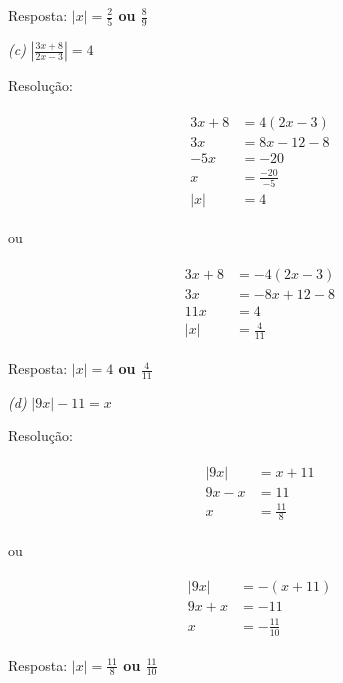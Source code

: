 \documentclass[12 pt, openright, twoside, a4paper, english, french, spanish, brazil]{abntex2}
\newcommand\bolden[1]{{\boldmath\bfseries#1}}
\begin{document}
Resposta: \bolden{$|x| = \frac{2}{5}$ ou $\frac{8}{9}$}


\bigskip


\textit{(c)} $\displaystyle \left|\frac{3x + 8}{2x - 3}\right| = 4$

\bigskip

Resolução:

\begin{align*}
\begin{split}
3x + 8 &= 4(2x - 3) \\
3x &= 8x - 12 - 8 \\
-5x &= -20 \\
x &= \frac{-20}{-5} \\
|x| &= 4
\end{split}
\end{align*}
\begin{center}
ou
\end{center}
\begin{align*}
\begin{split}
3x + 8 &= -4(2x - 3) \\
3x &= -8x + 12 - 8 \\
11x &= 4 \\
|x| &= \frac{4}{11}
\end{split}
\end{align*}

Resposta: \bolden{$|x| = 4$ ou $\frac{4}{11}$}


\bigskip


\textit{(d)} $|9x| - 11 = x$

Resolução: 

\begin{align*}
\begin{split}
|9x| &= x + 11 \\
9x - x &= 11 \\
x &= \frac{11}{8} 
\end{split}
\end{align*}
\begin{center}
ou
\end{center}
\begin{align*}
\begin{split}
|9x| &= -(x + 11) \\
9x + x &= -11 \\
x &= -\frac{11}{10} 
\end{split}
\end{align*}

Resposta: \bolden{$|x| = \frac{11}{8}$ ou $\frac{11}{10}$}
\end{document}
